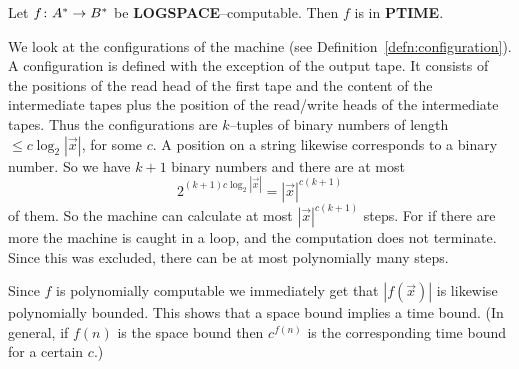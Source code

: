 \begin{thm}
Let $f \colon A^{\ast} \rightarrow B^{\ast}$ be \textbf{LOGSPACE}--computable.
Then $f$ is in \textbf{PTIME}.
\end{thm}
\proofbeg
We look at the configurations of the machine (see 
Definition~\ref{defn:configuration}). A configuration
is defined with the exception of the output tape. It consists
of the positions of the read head of the first tape and the
content of the intermediate tapes plus the position of the
read/write heads of the intermediate tapes. Thus the configurations
are $k$--tuples of binary numbers of length $\leq c \log_2 |\vec{x}|$, 
for some $c$. A position on a string likewise corresponds to a binary 
number. So we have $k+1$ binary numbers and there are at most
\begin{equation}
2^{(k+1)c \log_2 |\vec{x}|} = |\vec{x}|^{c(k+1)}
\end{equation}
of them. So the machine can calculate at most $|\vec{x}|^{c(k+1)}$
steps. For if there are more the machine is caught in a loop, and
the computation does not terminate. Since this was excluded,
there can be at most polynomially many steps.
\proofend

Since $f$ is polynomially computable we immediately get that
$|f(\vec{x})|$ is likewise polynomially bounded.  This shows
that a space bound implies a time bound.  (In general, if $f(n)$
is the space bound then $c^{f(n)}$ is the corresponding time bound 
for a certain $c$.)

